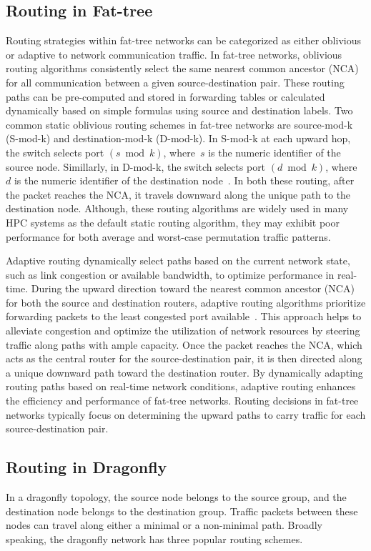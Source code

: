 \subsection{Routing in Fat-tree}
Routing strategies within fat-tree networks can be categorized as either oblivious or adaptive to network communication traffic. In fat-tree networks, oblivious routing algorithms consistently select the same nearest common ancestor (NCA) for all communication between a given source-destination pair. These routing paths can be pre-computed and stored in forwarding tables or calculated dynamically based on simple formulas using source and destination labels. Two common static oblivious routing schemes in fat-tree networks are source-mod-k (S-mod-k) and destination-mod-k (D-mod-k). In S-mod-k at each upward hop, the switch selects port
$(s \bmod k)$, where~$s$ is the numeric identifier of the source node. Simillarly, in D-mod-k, the switch selects port
$(d \bmod k)$, where~$d$ is the numeric identifier of the destination node~\cite{rodriguez2009oblivious, mahapatra2012limited}. In both these routing, after the packet reaches the NCA, it travels downward along the unique path to the destination node. Although, these routing algorithms are widely used in many HPC systems as the default static routing algorithm, they may exhibit poor performance for both average and worst-case permutation traffic patterns. 

Adaptive routing dynamically select paths based on the current network state, such as link congestion or available bandwidth, to optimize performance in real-time. During the upward direction toward the nearest common ancestor (NCA) for both the source and destination routers, adaptive routing algorithms prioritize forwarding packets to the least congested port available~\cite{gomez2007deterministic}. This approach helps to alleviate congestion and optimize the utilization of network resources by steering traffic along paths with ample capacity. Once the packet reaches the NCA, which acts as the central router for the source-destination pair, it is then directed along a unique downward path toward the destination router. By dynamically adapting routing paths based on real-time network conditions, adaptive routing enhances the efficiency and performance of fat-tree networks. Routing decisions in fat-tree networks typically focus on determining the upward paths to carry traffic for each source-destination pair.

\subsection{Routing in Dragonfly}
In a dragonfly topology, the source node belongs to the source group, and the destination node belongs to the destination group. Traffic packets between these nodes can travel along either a minimal or a non-minimal path. Broadly speaking, the dragonfly network has three popular routing schemes.

